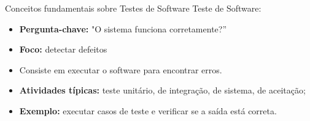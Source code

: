 \begin{frame}{Conceitos fundamentais sobre Testes de Software}
    Teste de Software:
    \begin{itemize}
        \item \textbf{Pergunta-chave:}  "O sistema funciona corretamente?”
        \item \textbf{Foco:} detectar defeitos
        \item Consiste em executar o software para encontrar erros.
        \item \textbf{Atividades típicas:} teste unitário, de integração, de sistema, de aceitação;
        \item \textbf{Exemplo:} executar casos de teste e verificar se a saída está correta.
    \end{itemize}
\end{frame}
